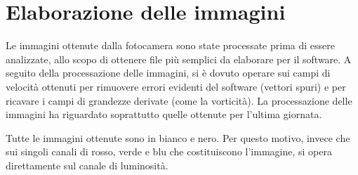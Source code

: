 \documentclass{article} %
\begin{document}
\section{Elaborazione delle immagini}
Le immagini ottenute dalla fotocamera sono state processate prima di essere analizzate, allo scopo di ottenere file più semplici da elaborare per il software. A seguito della processazione delle immagini, si è dovuto operare sui campi di velocità ottenuti per rimuovere errori evidenti del software (vettori spuri) e per ricavare i campi di grandezze derivate (come la vorticità). La processazione delle immagini ha riguardato soprattutto quelle ottenute per l'ultima giornata.\par
Tutte le immagini ottenute sono in bianco e nero. Per questo motivo, invece che sui singoli canali di rosso, verde e blu che costituiscono l'immagine, si opera direttamente sul canale di luminosità.
\end{document}
